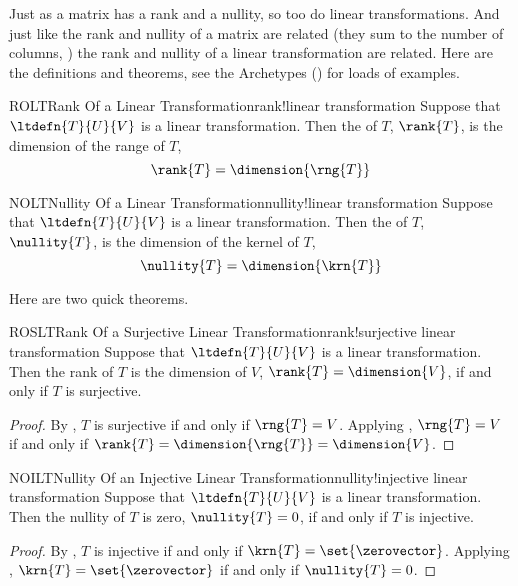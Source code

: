 %
Just as a matrix has a rank and a nullity, so too do linear transformations.  And just like the rank and nullity of a matrix are related (they sum to the number of columns, ) the rank and nullity of a linear transformation are related.  Here are the definitions and theorems, see the Archetypes () for loads of examples.
%
\begin{definition}{ROLT}{Rank Of a Linear Transformation}{rank!linear transformation}
Suppose that $\ltdefn{T}{U}{V}$ is a linear transformation.  Then the  of $T$, $\rank{T}$, is the dimension of the range of $T$,
%
\begin{equation*}
\rank{T}=\dimension{\rng{T}}
\end{equation*}
%
\end{definition}
%
\begin{definition}{NOLT}{Nullity Of a Linear Transformation}{nullity!linear transformation}
Suppose that $\ltdefn{T}{U}{V}$ is a linear transformation.  Then the  of $T$, $\nullity{T}$, is the dimension of the kernel of $T$,
%
\begin{equation*}
\nullity{T}=\dimension{\krn{T}}
\end{equation*}
%
\end{definition}
%
Here are two quick theorems.
%
\begin{theorem}{ROSLT}{Rank Of a Surjective Linear Transformation}{rank!surjective linear transformation}
Suppose that $\ltdefn{T}{U}{V}$ is a linear transformation.  Then the rank of $T$ is the dimension of $V$, $\rank{T}=\dimension{V}$, if and only if $T$ is surjective.
\end{theorem}
%
\begin{proof}
By , $T$ is surjective if and only if $\rng{T}=V$.  Applying , $\rng{T}=V$ if and only if $\rank{T}=\dimension{\rng{T}}=\dimension{V}$.
\end{proof}
%
%
\begin{theorem}{NOILT}{Nullity Of an Injective Linear Transformation}{nullity!injective linear transformation}
Suppose that $\ltdefn{T}{U}{V}$ is a linear transformation.  Then the nullity of $T$ is zero, $\nullity{T}=0$, if and only if $T$ is injective.
\end{theorem}
%
\begin{proof}
By , $T$ is injective if and only if $\krn{T}=\set{\zerovector}$.  Applying , $\krn{T}=\set{\zerovector}$ if and only if $\nullity{T}=0$.
\end{proof}
